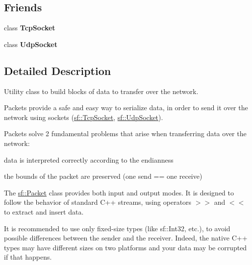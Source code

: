 \subsection*{Friends}
\begin{DoxyCompactItemize}
\item 
\mbox{\label{classsf_1_1_packet_aa8b32310b01d4bb702d6bcb969d5f130}} 
class {\bfseries Tcp\+Socket}
\item 
\mbox{\label{classsf_1_1_packet_ae128c6687ced82c6157c5f865f8dec5c}} 
class {\bfseries Udp\+Socket}
\end{DoxyCompactItemize}


\subsection{Detailed Description}
Utility class to build blocks of data to transfer over the network. 

Packets provide a safe and easy way to serialize data, in order to send it over the network using sockets (\hyperlink{classsf_1_1_tcp_socket}{sf\+::\+Tcp\+Socket}, \hyperlink{classsf_1_1_udp_socket}{sf\+::\+Udp\+Socket}).

Packets solve 2 fundamental problems that arise when transferring data over the network\+: \begin{DoxyItemize}
\item data is interpreted correctly according to the endianness \item the bounds of the packet are preserved (one send == one receive)\end{DoxyItemize}
The \hyperlink{classsf_1_1_packet}{sf\+::\+Packet} class provides both input and output modes. It is designed to follow the behavior of standard C++ streams, using operators $>$$>$ and $<$$<$ to extract and insert data.

It is recommended to use only fixed-\/size types (like sf\+::\+Int32, etc.), to avoid possible differences between the sender and the receiver. Indeed, the native C++ types may have different sizes on two platforms and your data may be corrupted if that happens.

